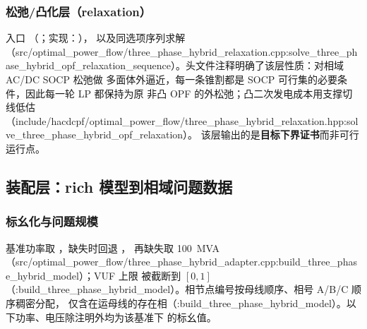 \subsubsection*{松弛/凸化层（relaxation）}
入口 
（；实现：），
以及同选项序列求解 
（src/optimal\_power\_flow/three\_phase\_hybrid\_relaxation.cpp:solve\_three\_phase\_hybrid\_opf\_relaxation\_sequence）。头文件注释明确了该层性质：对相域 AC/DC SOCP 松弛做
多面体外逼近，每一条锥割都是 SOCP 可行集的必要条件，因此每一轮 LP 都保持为原
非凸 OPF 的外松弛；凸二次发电成本用支撑切线低估（include/hacdcpf/optimal\_power\_flow/three\_phase\_hybrid\_relaxation.hpp:solve\_three\_phase\_hybrid\_opf\_relaxation）。
该层输出的是\textbf{目标下界证书}而非可行运行点。

\subsection{装配层：rich 模型到相域问题数据}\label{subsec:tp-adapter}

\subsubsection*{标幺化与问题规模}
基准功率取 ，缺失时回退 ，
再缺失取 100~MVA（src/optimal\_power\_flow/three\_phase\_hybrid\_adapter.cpp:build\_three\_phase\_hybrid\_model）；VUF 上限  被截断到
$[0,1]$（:build\_three\_phase\_hybrid\_model）。相节点编号按母线顺序、相号 A/B/C 顺序稠密分配，
仅含在运母线的存在相（:build\_three\_phase\_hybrid\_model）。以下功率、电压除注明外均为该基准下
的标幺值。

